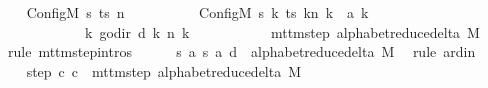 \begin{isabellebody}
\ \ \isamarkupfalse%
\ {\isachardoublequoteopen}{\isacharparenleft}{\kern0pt}Config\isactrlsub M\ {\isacharquery}{\kern0pt}s\ ts\ n{\isacharcomma}{\kern0pt}\isanewline
\ \ \ \ \ \ \ \ \ \ Config\isactrlsub M\ {\isacharquery}{\kern0pt}s{\isacharprime}{\kern0pt}\ {\isacharparenleft}{\kern0pt}{\isasymlambda}k{\isachardot}{\kern0pt}\ {\isacharparenleft}{\kern0pt}ts\ k{\isacharparenright}{\kern0pt}{\isacharparenleft}{\kern0pt}n\ k\ {\isacharcolon}{\kern0pt}{\isacharequal}{\kern0pt}\ {\isacharquery}{\kern0pt}a\ k{\isacharparenright}{\kern0pt}{\isacharparenright}{\kern0pt}\isanewline
\ \ \ \ \ \ \ \ \ \ \ \ {\isacharparenleft}{\kern0pt}{\isasymlambda}k{\isachardot}{\kern0pt}\ go{\isacharunderscore}{\kern0pt}dir\ {\isacharparenleft}{\kern0pt}{\isacharquery}{\kern0pt}d\ k{\isacharparenright}{\kern0pt}\ {\isacharparenleft}{\kern0pt}n\ k{\isacharparenright}{\kern0pt}{\isacharparenright}{\kern0pt}{\isacharparenright}{\kern0pt}\isanewline
\ \ \ \ \ \ \ \ \ \ {\isasymin}\ mttm{\isacharunderscore}{\kern0pt}step\ {\isacharparenleft}{\kern0pt}alphabet{\isacharunderscore}{\kern0pt}reduce{\isacharunderscore}{\kern0pt}delta\ M{\isacharparenright}{\kern0pt}{\isachardoublequoteclose}\isanewline
\ \ \isamarkupfalse%
\ {\isacharparenleft}{\kern0pt}rule\ mttm{\isacharunderscore}{\kern0pt}step{\isachardot}{\kern0pt}intros{\isacharparenright}{\kern0pt}\isanewline
\ \ \ \ \isamarkupfalse%
\ {\isachardoublequoteopen}{\isacharparenleft}{\kern0pt}{\isacharquery}{\kern0pt}s{\isacharcomma}{\kern0pt}\ {\isacharquery}{\kern0pt}a{\isacharcomma}{\kern0pt}\ {\isacharquery}{\kern0pt}s{\isacharprime}{\kern0pt}{\isacharcomma}{\kern0pt}\ {\isacharquery}{\kern0pt}a{\isacharcomma}{\kern0pt}\ {\isacharquery}{\kern0pt}d{\isacharparenright}{\kern0pt}\ {\isasymin}\ alphabet{\isacharunderscore}{\kern0pt}reduce{\isacharunderscore}{\kern0pt}delta\ M{\isachardoublequoteclose}\ \isamarkupfalse%
\ {\isacharparenleft}{\kern0pt}rule\ ard{\isacharunderscore}{\kern0pt}in{\isacharparenright}{\kern0pt}\isanewline
\ \ \isamarkupfalse%
\isanewline
\ \ \isamarkupfalse%
\ step{\isacharcolon}{\kern0pt}\ {\isachardoublequoteopen}{\isacharparenleft}{\kern0pt}c{\isacharprime}{\kern0pt}{\isacharcomma}{\kern0pt}\ {\isacharquery}{\kern0pt}c{\isacharprime}{\kern0pt}{\isacharprime}{\kern0pt}{\isacharparenright}{\kern0pt}\ {\isasymin}\ mttm{\isacharunderscore}{\kern0pt}step\ {\isacharparenleft}{\kern0pt}alphabet{\isacharunderscore}{\kern0pt}reduce{\isacharunderscore}{\kern0pt}delta\ M{\isacharparenright}{\kern0pt}{\isachardoublequoteclose}\isanewline

\end{isabellebody}

